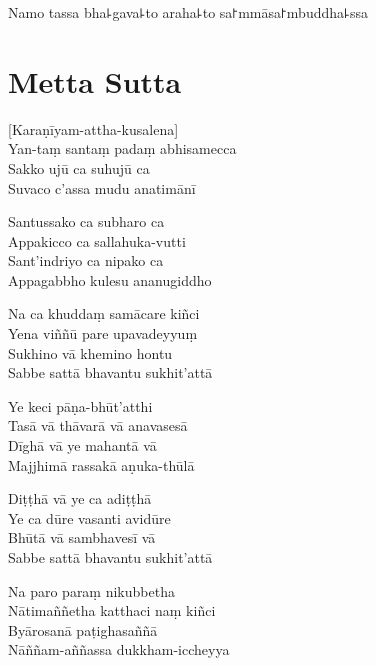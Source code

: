 \documentclass[
  babelLanguage=portuguese,
  final,
  showtrims,
]{chantingbook}
\begin{document}
\begin{leader}
\end{leader}

Namo tassa bha꜕gava꜕to araha꜕to sa꜓mmāsa꜓mbuddha꜕ssa


\artoptfalse

\chapter[Metta Sutta]{Metta Sutta}

\begin{leader}
\end{leader}

[Karaṇīyam-attha-kusalena]\\
Yan-taṃ santaṃ padaṃ abhisamecca\\
Sakko ujū ca suhujū ca\\
Suvaco c'assa mudu anatimānī

Santussako ca subharo ca\\
Appakicco ca sallahuka-vutti\\
Sant'indriyo ca nipako ca\\
Appagabbho kulesu ananugiddho

Na ca khuddaṃ samācare kiñci\\
Yena viññū pare upavadeyyuṃ\\
Sukhino vā khemino hontu\\
Sabbe sattā bhavantu sukhit'attā

Ye keci pāṇa-bhūt'atthi\\
Tasā vā thāvarā vā anavasesā\\
Dīghā vā ye mahantā vā\\
Majjhimā rassakā aṇuka-thūlā

Diṭṭhā vā ye ca adiṭṭhā\\
Ye ca dūre vasanti avidūre\\
Bhūtā vā sambhavesī vā\\
Sabbe sattā bhavantu sukhit'attā

\enlargethispage{\baselineskip}

Na paro paraṃ nikubbetha\\
Nātimaññetha katthaci naṃ kiñci\\
Byārosanā paṭighasaññā\\
Nāññam-aññassa dukkham-iccheyya

\clearpage
\end{document}
